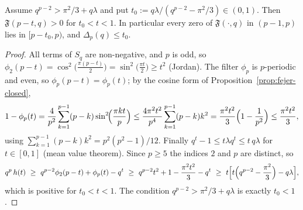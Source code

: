 \begin{lemma}\label{lem:window-t0}
Assume $q^{p-2}>\pi^2/3+q\lambda$ and put $t_0:=q\lambda/(q^{p-2}-\pi^2/3)\in(0,1)$. Then $\mathfrak F(p-t,q)>0$ for $t_0<t<1$. In particular every zero of $\mathfrak F(\cdot,q)$ in $(p-1,p)$ lies in $[p-t_0,p)$, and $\Delta_p(q)\le t_0$.
\end{lemma}
\begin{proof}
All terms of $S_q$ are non-negative, and $p$ is odd, so $\phi_2(p-t)=\cos^2\!\bigl(\tfrac{\pi(p-t)}2\bigr)=\sin^2\!\bigl(\tfrac{\pi t}2\bigr)\ge t^2$ (Jordan). The filter $\phi_p$ is $p$-periodic and even, so $\phi_p(p-t)=\phi_p(t)$; by the cosine form of Proposition~\ref{prop:fejer-closed},
\[
1-\phi_p(t)=\frac4{p^2}\sum_{k=1}^{p-1}(p-k)\sin^2\!\Bigl(\frac{\pi kt}{p}\Bigr)\le\frac{4\pi^2t^2}{p^4}\sum_{k=1}^{p-1}(p-k)k^2=\frac{\pi^2t^2}{3}\Bigl(1-\frac1{p^2}\Bigr)\le\frac{\pi^2t^2}{3},
\]
using $\sum_{k=1}^{p-1}(p-k)k^2=p^2(p^2-1)/12$. Finally $q^t-1\le t\lambda q^{t}\le t\,q\lambda$ for $t\in[0,1]$ (mean value theorem). Since $p\ge5$ the indices $2$ and $p$ are distinct, so
\[
q^p\,h(t)\ \ge\ q^{p-2}\phi_2(p-t)+\phi_p(t)-q^t\ \ge\ q^{p-2}t^2+1-\frac{\pi^2t^2}3-q^t\ \ge\ t\Bigl[t\Bigl(q^{p-2}-\frac{\pi^2}3\Bigr)-q\lambda\Bigr],
\]
which is positive for $t_0<t<1$. The condition $q^{p-2}>\pi^2/3+q\lambda$ is exactly $t_0<1$.
\end{proof}

